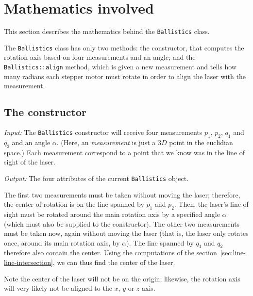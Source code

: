 \documentclass{article}
\newcommand\class[1]{\texttt{#1}}
\newcommand\method[1]{\texttt{#1}}
\begin{document}
\section{Mathematics involved}
\label{sec:math}

This section describes the mathematics behind the \class{Ballistics} class.

The \class{Ballistics} class has only two methods: the constructor,
that computes the rotation axis based on four measurements and an angle;
and the \method{Ballistics::align} method,
which is given a new measurement and tells how many radians
each stepper motor must rotate in order to align the laser with the measurement.

\subsection{The constructor}
\label{sec:ballistics-constructor}

\emph{Input:}
The \class{Ballistics} constructor will receive four measurements
$p_1$, $p_2$, $q_1$ and $q_2$ and an angle $\alpha$.
(Here, an \emph{measurement} is just a $3D$ point in the euclidian space.)
Each measurement correspond to a point
that we know was in the line of sight of the laser.

\noindent \emph{Output:}
The four attributes of the current \class{Ballistics} object.

The first two measurements must be taken without moving the laser;
therefore, the center of rotation is on the line spanned by $p_1$ and $p_2$.
Then, the laser's line of sight must be rotated around the main rotation axis
by a specified angle $\alpha$ (which must also be supplied to the constructor).
The other two measurements must be taken now, again without moving the laser
(that is, the laser only rotates once, around its main rotation axis, by $\alpha$).
The line spanned by $q_1$ and $q_2$ therefore also contain the center.
Using the computations of the section~\ref{sec:line-line-intersection},
we can thus find the center of the laser.

Note the center of the laser will not be on the origin;
likewise, the rotation axis will very likely not be aligned to
the $x$, $y$ or $z$ axis.
\end{document}
